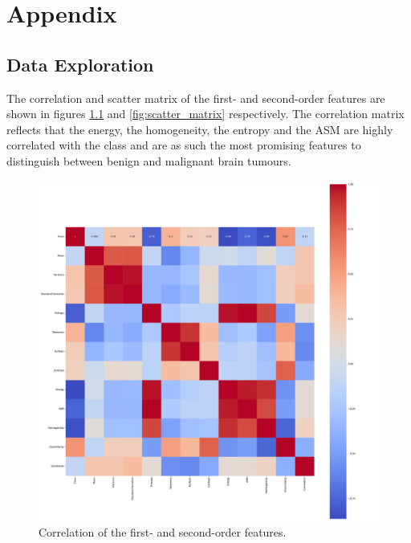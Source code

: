 \chapter{Appendix}
\label{cha:appendix}

\section{Data Exploration}
\label{sec:DataExploration}


The correlation and scatter matrix of the first- and second-order features are shown in figures \ref{fig:correlation} and \ref{fig:scatter_matrix} respectively.
The correlation matrix reflects that the energy, the homogeneity, the entropy and the ASM are highly correlated with the class and are as such the most promising features to distinguish between benign and malignant brain tumours.

\begin{figure}
    \centering
    \includegraphics[width=1.2\textwidth]{plots/correlation.pdf}
    \caption{Correlation of the first- and second-order features.}
    \label{fig:correlation}
\end{figure}

